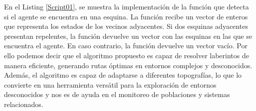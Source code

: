        En el Listing \ref{Script01}, se muestra la implementaci\'on de la funci\'on que detecta si el agente se encuentra en una esquina. 
            La funci\'on recibe un vector de enteros que representa los estados de los vecinos adyacentes. Si dos esquinas adyacentes 
            presentan repelentes, la funci\'on devuelve un vector con las esquinas en las que se encuentra el agente. 
            En caso contrario, la funci\'on devuelve un vector vac\'io.
        \vskip 0.5cm
        Por ello podemos decir que el algoritmo propuesto es capaz de resolver laberintos de manera eficiente, 
            generando rutas \'optimas en entornos complejos y desconocidos. Adem\'as, el algoritmo es capaz de 
            adaptarse a diferentes topograf\'ias, lo que lo convierte en una herramienta vers\'atil para la exploraci\'on 
            de entornos desconocidos y nos es de ayuda en el monitoreo de poblaciones y sistemas relacionados.
        \vskip 0.5cm
        
        
        
        
        
        
        
